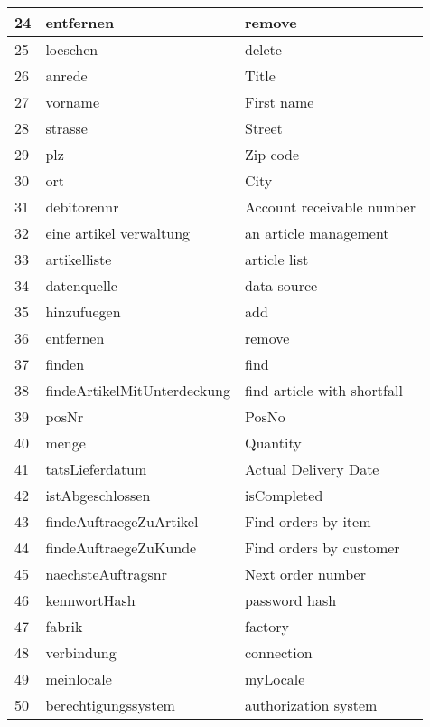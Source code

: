 \begin{center}
\begin{longtable}{|p{0.6cm}|p{8cm}|p{6cm}|}
24 & entfernen & remove\\ \hline
25 & loeschen & delete\\ \hline
26 & anrede & Title\\ \hline
27 & vorname & First name\\ \hline
28 & strasse & Street\\ \hline
29 & plz & Zip code\\ \hline
30 & ort & City\\ \hline
31 & debitorennr & Account receivable number\\ \hline
32 & eine artikel verwaltung & an article management\\ \hline
33 & artikelliste & article list\\ \hline
34 & datenquelle & data source\\ \hline
35 & hinzufuegen & add\\ \hline
36 & entfernen & remove\\ \hline
37 & finden & find\\ \hline
38 & findeArtikelMitUnterdeckung & find article with shortfall\\ \hline
39 & posNr & PosNo\\ \hline
40 & menge & Quantity\\ \hline
41 & tatsLieferdatum & Actual Delivery Date\\ \hline
42 & istAbgeschlossen & isCompleted\\ \hline
43 & findeAuftraegeZuArtikel & Find orders by item\\ \hline
44 & findeAuftraegeZuKunde & Find orders by customer\\ \hline
45 & naechsteAuftragsnr & Next order number\\ \hline
46 & kennwortHash & password hash\\ \hline
47 & fabrik & factory\\ \hline
48 & verbindung & connection\\ \hline
49 & meinlocale & myLocale\\ \hline
50 & berechtigungssystem & authorization system\\ \hline
\end{longtable}
\end{center}